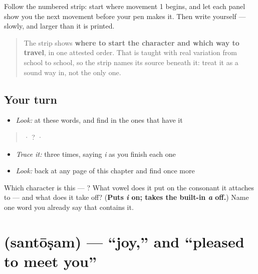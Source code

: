 Follow the numbered strip: start where movement 1 begins, and let each panel show you the next movement before your pen makes it. Then write  yourself — slowly, and larger than it is printed.

\begin{quote}
The strip shows \textbf{where to start the character and which way to travel}, in one attested order. That is taught with real variation from school to school, so the strip names its source beneath it: treat it as a sound way in, not the only one.
\end{quote}

\subsection*{Your turn}
\begin{itemize}
\raggedright
  \item \emph{Look:} at these words, and find  in the ones that have it
\end{itemize}

\begin{quote}
  ·    ?  ·  
\end{quote}

\begin{itemize}
\raggedright
  \item \emph{Trace it:}  three times, saying \emph{i} as you finish each one
  \item \emph{Look:} back at any page of this chapter and find  once more
\end{itemize}

\begin{tcolorbox}[breakable,colback=teal!4,colframe=teal!35!black,title={Before you move on}]
Which character is this — ? What vowel does it put on the consonant it attaches to — and what does it take off? (\textbf{Puts \emph{i} on; takes the built-in \emph{a} off.}) Name one word you already say that contains it.
\end{tcolorbox}
\section[\texorpdfstring{\te{సంతోషం} (santōṣam)}{సంతోషం (santōṣam)}]{ (santōṣam) — \textquotedblleft{}joy,\textquotedblright{} and \textquotedblleft{}pleased to meet you\textquotedblright{}}

\label{lesson:TE-C02-santosham}



